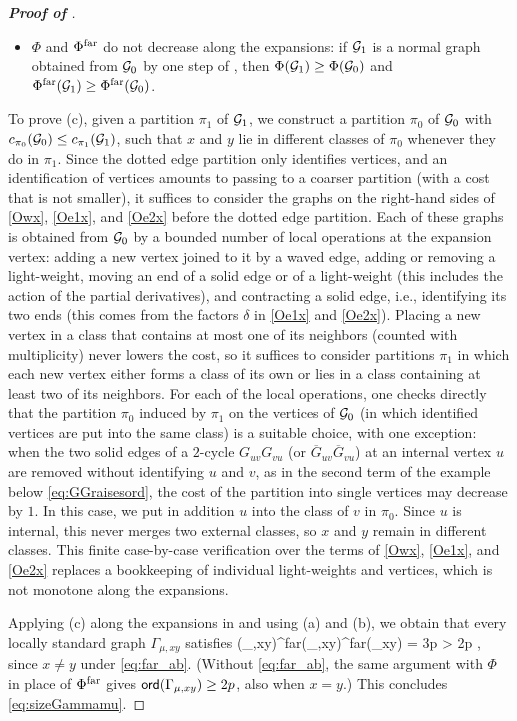 \begin{proof}[\bf Proof of ]
\begin{itemize}
\item[(c)] $\Phi$ and $\Phi^{\rm far}$ do not decrease along the expansions: if $\cal G_1$ is a normal graph obtained from $\cal G_0$ by one step of , then $\Phi(\cal G_1)\ge\Phi(\cal G_0)$ and $\Phi^{\rm far}(\cal G_1)\ge\Phi^{\rm far}(\cal G_0)$.
\end{itemize}
To prove (c), given a partition $\pi_1$ of $\cal G_1$, we construct a partition $\pi_0$ of $\cal G_0$ with $c_{\pi_0}(\cal G_0)\le c_{\pi_1}(\cal G_1)$, such that $x$ and $y$ lie in different classes of $\pi_0$ whenever they do in $\pi_1$. Since the dotted edge partition only identifies vertices, and an identification of vertices amounts to passing to a coarser partition (with a cost that is not smaller), it suffices to consider the graphs on the right-hand sides of \eqref{Owx}, \eqref{Oe1x}, and \eqref{Oe2x} before the dotted edge partition. Each of these graphs is obtained from $\cal G_0$ by a bounded number of local operations at the expansion vertex: adding a new vertex joined to it by a waved edge, adding or removing a light-weight, moving an end of a solid edge or of a light-weight (this includes the action of the partial derivatives), and contracting a solid edge, i.e., identifying its two ends (this comes from the factors $\delta$ in \eqref{Oe1x} and \eqref{Oe2x}). Placing a new vertex in a class that contains at most one of its neighbors (counted with multiplicity) never lowers the cost, so it suffices to consider partitions $\pi_1$ in which each new vertex either forms a class of its own or lies in a class containing at least two of its neighbors. For each of the local operations, one checks directly that the partition $\pi_0$ induced by $\pi_1$ on the vertices of $\cal G_0$ (in which identified vertices are put into the same class) is a suitable choice, with one exception: when the two solid edges of a $2$-cycle $G_{uv}G_{vu}$ (or $\overline G_{uv}\overline G_{vu}$) at an internal vertex $u$ are removed without identifying $u$ and $v$, as in the second term of the example below \eqref{eq:GGraisesord}, the cost of the partition into single vertices may decrease by $1$. In this case, we put in addition $u$ into the class of $v$ in $\pi_0$. Since $u$ is internal, this never merges two external classes, so $x$ and $y$ remain in different classes. This finite case-by-case verification over the terms of \eqref{Owx}, \eqref{Oe1x}, and \eqref{Oe2x} replaces a bookkeeping of individual light-weights and vertices, which is not monotone along the expansions.

Applying (c) along the expansions in  and using (a) and (b), we obtain that every locally standard graph $\Gamma_{\mu,xy}$ satisfies
\be\label{eq:ordGinter} \ord(\Gamma_{\mu,xy})\ge \Phi^{\rm far}(\Gamma_{\mu,xy})\ge \Phi^{\rm far}(\Gamma_{xy}) = 3p > 2p ,\ee
since $x\ne y$ under \eqref{eq:far_ab}. (Without \eqref{eq:far_ab}, the same argument with $\Phi$ in place of $\Phi^{\rm far}$ gives $\ord(\Gamma_{\mu,xy})\ge 2p$, also when $x=y$.) This concludes \eqref{eq:sizeGammamu}.
\end{proof}

